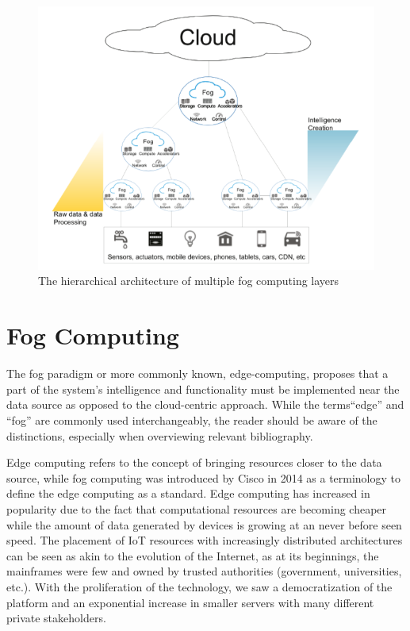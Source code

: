\begin{figure}[h]
    \centering
    \includegraphics[width=\textwidth]{images/hierarchichal_architecture(from-primer).png}
    \caption{The hierarchical architecture of multiple fog computing layers\cite{ai2018edge} }
    \label{fig:hier_arch_primer}
\end{figure}

\section{Fog Computing}
The fog paradigm or more commonly known, \gls{edge-computing},  proposes that a part of the system’s intelligence and functionality must be implemented near the data source as opposed to the cloud-centric approach. While the terms“edge” and “fog” are commonly used interchangeably, the reader should be aware of the distinctions, especially when overviewing relevant bibliography. 

Edge computing refers to the concept of bringing resources closer to the data source, while fog computing was introduced by Cisco in 2014 as a terminology to define the edge computing as a standard\cite{linthicum2019}.  Edge computing has increased in popularity due to the fact that computational resources are becoming cheaper while the amount of data generated by devices is growing at an never before seen speed\cite{ericsson}. The placement of IoT resources with increasingly distributed architectures can be seen as akin to the evolution of the Internet, as at its beginnings, the mainframes were few and owned by trusted authorities (government, universities, etc.)\cite{leiner2009brief}. With the proliferation of the technology, we saw a democratization of the platform and an exponential increase in smaller servers with many different private stakeholders. 

